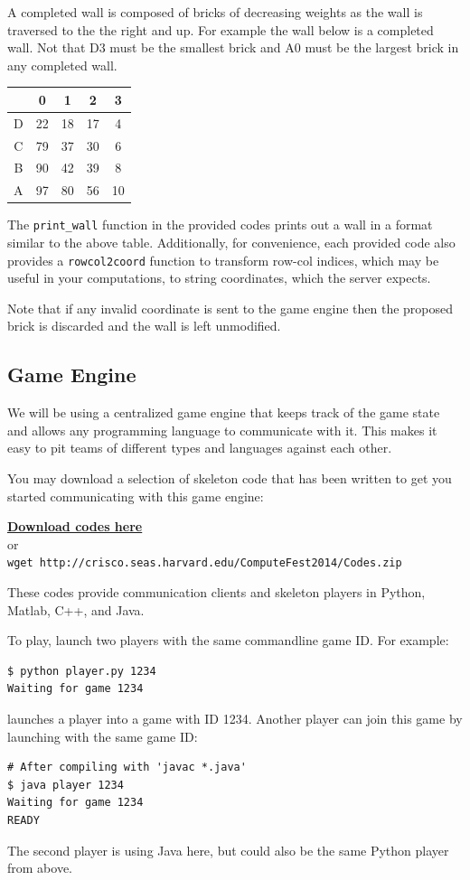 \documentclass[12pt,letterpaper,twoside]{article}
\newcommand{\subproblem}[1]{\phantomsection\addcontentsline{toc}{subsection}{#1}\subsection*{#1}}
\begin{document}
A completed wall is composed of bricks of decreasing weights as the wall is traversed to the the right and up. For example the wall below is a completed wall. Not that D3 must be the smallest brick and A0 must be the largest brick in any completed wall.

\begin{center}
\begin{tabular}{c||c|c|c|c||}
 & 0 & 1 & 2 & 3\\
 \hline
 \hline
D & 22 & 18 & 17 & 4\\
\hline
C & 79 & 37 & 30 & 6\\
\hline
B & 90 & 42 & 39 & 8\\
\hline
A & 97 & 80 & 56 & 10\\
\hline
\hline
\end{tabular}
\end{center}

The {\tt print\_wall} function in the provided codes prints out a wall in a format similar to the above table. Additionally, for convenience, each provided code also provides a {\tt rowcol2coord} function to transform row-col indices, which may be useful in your computations, to string coordinates, which the server expects.

Note that if any invalid coordinate is sent to the game engine then the proposed brick is discarded and the wall is left unmodified.

\subproblem{Game Engine}

We will be using a centralized game engine that keeps track of the game state and allows any programming language to communicate with it. This makes it easy to pit teams of different types and languages against each other.

You may download a selection of skeleton code that has been written to get you started communicating with this game engine:
\begin{center}
\href{http://crisco.seas.harvard.edu/ComputeFest2014/Codes.zip}{\large\bf Download codes here}\\
or \\
{\tt wget http://crisco.seas.harvard.edu/ComputeFest2014/Codes.zip}
\end{center}
These codes provide communication clients and skeleton players in Python, Matlab, C++, and Java.

To play, launch two players with the same commandline game ID. For example:
\begin{verbatim}
$ python player.py 1234
Waiting for game 1234
\end{verbatim}
launches a player into a game with ID 1234. Another player can join this game by launching with the same game ID:
\begin{verbatim}
# After compiling with 'javac *.java'
$ java player 1234
Waiting for game 1234
READY
\end{verbatim}
The second player is using Java here, but could also be the same Python player from above.
\end{document}
